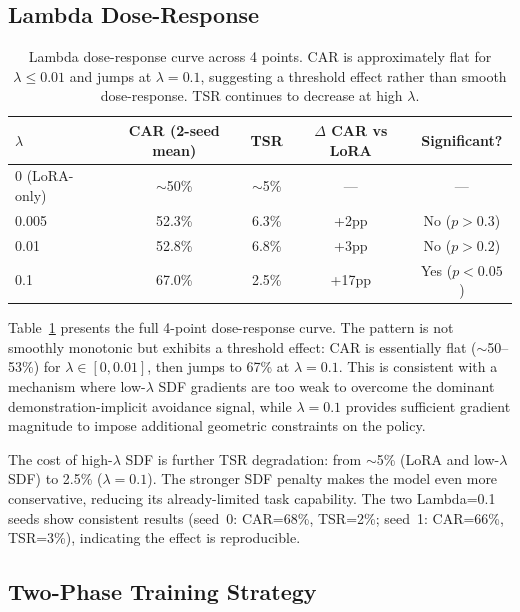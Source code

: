 \documentclass[letterpaper]{article}
\begin{document}
\subsection{Lambda Dose-Response}

\begin{table}[t]
\centering
\caption{Lambda dose-response curve across 4 points. CAR is approximately flat for $\lambda \leq 0.01$ and jumps at $\lambda=0.1$, suggesting a threshold effect rather than smooth dose-response. TSR continues to decrease at high $\lambda$.}
\label{tab:lambda}
\begin{tabular}{lcccc}
\toprule
$\lambda$ & \textbf{CAR (2-seed mean)} & \textbf{TSR} & \textbf{$\Delta$ CAR vs LoRA} & \textbf{Significant?} \\
\midrule
0 (LoRA-only) & $\sim$50\% & $\sim$5\% & --- & --- \\
0.005 & 52.3\% & 6.3\% & +2pp & No ($p>0.3$) \\
0.01 & 52.8\% & 6.8\% & +3pp & No ($p>0.2$) \\
0.1 & 67.0\% & 2.5\% & +17pp & Yes ($p<0.05$) \\
\bottomrule
\end{tabular}
\end{table}

Table~\ref{tab:lambda} presents the full 4-point dose-response curve. The pattern is not smoothly monotonic but exhibits a threshold effect: CAR is essentially flat ($\sim$50--53\%) for $\lambda \in [0, 0.01]$, then jumps to 67\% at $\lambda=0.1$. This is consistent with a mechanism where low-$\lambda$ SDF gradients are too weak to overcome the dominant demonstration-implicit avoidance signal, while $\lambda=0.1$ provides sufficient gradient magnitude to impose additional geometric constraints on the policy.

The cost of high-$\lambda$ SDF is further TSR degradation: from $\sim$5\% (LoRA and low-$\lambda$ SDF) to 2.5\% ($\lambda=0.1$). The stronger SDF penalty makes the model even more conservative, reducing its already-limited task capability. The two Lambda=0.1 seeds show consistent results (seed~0: CAR=68\%, TSR=2\%; seed~1: CAR=66\%, TSR=3\%), indicating the effect is reproducible.


\subsection{Two-Phase Training Strategy}
\end{document}
